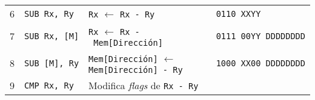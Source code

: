 \documentclass[12pt,twoside]{templates/unerthesis}
\begin{document}
\begin{longtable}[]{@{}llll@{}}
\begin{minipage}[t]{0.09\columnwidth}
6\strut
\end{minipage} & \begin{minipage}[t]{0.27\columnwidth}\raggedright
\texttt{SUB\ Rx,\ Ry}\strut
\end{minipage} & \begin{minipage}[t]{0.27\columnwidth}\raggedright
\texttt{Rx} \(\leftarrow\) \texttt{Rx\ -\ Ry}\strut
\end{minipage} & \begin{minipage}[t]{0.27\columnwidth}\raggedright
\texttt{0110\ XXYY}\strut
\end{minipage}\tabularnewline
\begin{minipage}[t]{0.09\columnwidth}\raggedright
7\strut
\end{minipage} & \begin{minipage}[t]{0.27\columnwidth}\raggedright
\texttt{SUB\ Rx,\ {[}M{]}}\strut
\end{minipage} & \begin{minipage}[t]{0.27\columnwidth}\raggedright
\texttt{Rx} \(\leftarrow\) \texttt{Rx\ -\ Mem{[}Dirección{]}}\strut
\end{minipage} & \begin{minipage}[t]{0.27\columnwidth}\raggedright
\texttt{0111\ 00YY\ DDDDDDDD}\strut
\end{minipage}\tabularnewline
\begin{minipage}[t]{0.09\columnwidth}\raggedright
8\strut
\end{minipage} & \begin{minipage}[t]{0.27\columnwidth}\raggedright
\texttt{SUB\ {[}M{]},\ Ry}\strut
\end{minipage} & \begin{minipage}[t]{0.27\columnwidth}\raggedright
\texttt{Mem{[}Dirección{]}} \(\leftarrow\) \texttt{Mem{[}Dirección{]}\ -\ Ry}\strut
\end{minipage} & \begin{minipage}[t]{0.27\columnwidth}\raggedright
\texttt{1000\ XX00\ DDDDDDDD}\strut
\end{minipage}\tabularnewline
\begin{minipage}[t]{0.09\columnwidth}\raggedright
9\strut
\end{minipage} & \begin{minipage}[t]{0.27\columnwidth}\raggedright
\texttt{CMP\ Rx,\ Ry}\strut
\end{minipage} & \begin{minipage}[t]{0.27\columnwidth}\raggedright
Modifica \emph{flags} de \texttt{Rx\ -\ Ry}\strut

\end{minipage}
\end{longtable}
\end{document}

